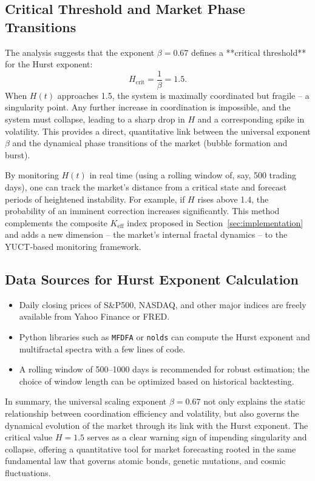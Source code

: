 \documentclass[11pt,a4paper]{article}
\theoremstyle{remark}
\begin{document}
\subsection{Critical Threshold and Market Phase Transitions}
The analysis suggests that the exponent \(\beta = 0.67\) defines a **critical threshold** for the Hurst exponent:
\[
H_{\text{crit}} = \frac{1}{\beta} = 1.5.
\]
When \(H(t)\) approaches 1.5, the system is maximally coordinated but fragile – a singularity point. Any further increase in coordination is impossible, and the system must collapse, leading to a sharp drop in \(H\) and a corresponding spike in volatility. This provides a direct, quantitative link between the universal exponent \(\beta\) and the dynamical phase transitions of the market (bubble formation and burst).

By monitoring \(H(t)\) in real time (using a rolling window of, say, 500 trading days), one can track the market’s distance from a critical state and forecast periods of heightened instability. For example, if \(H\) rises above 1.4, the probability of an imminent correction increases significantly. This method complements the composite \(K_{\mathrm{eff}}\) index proposed in Section~\ref{sec:implementation} and adds a new dimension – the market’s internal fractal dynamics – to the YUCT‑based monitoring framework.

\subsection{Data Sources for Hurst Exponent Calculation}
\begin{itemize}
	\item Daily closing prices of S\&P500, NASDAQ, and other major indices are freely available from Yahoo Finance or FRED.
	\item Python libraries such as \texttt{MFDFA} or \texttt{nolds} can compute the Hurst exponent and multifractal spectra with a few lines of code.
	\item A rolling window of 500–1000 days is recommended for robust estimation; the choice of window length can be optimized based on historical backtesting.
\end{itemize}

In summary, the universal scaling exponent \(\beta = 0.67\) not only explains the static relationship between coordination efficiency and volatility, but also governs the dynamical evolution of the market through its link with the Hurst exponent. The critical value \(H = 1.5\) serves as a clear warning sign of impending singularity and collapse, offering a quantitative tool for market forecasting rooted in the same fundamental law that governs atomic bonds, genetic mutations, and cosmic fluctuations.
	
\end{document}
